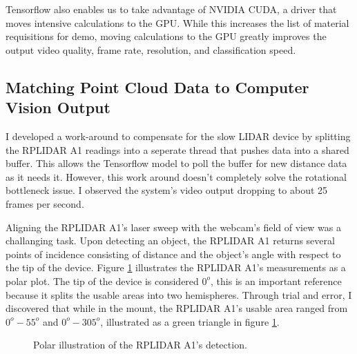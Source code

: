 \documentclass{article}
\begin{document}
  Tensorflow also enables us to take advantage of NVIDIA CUDA, a driver that moves intensive calculations to the GPU.
  While this increases the list of material requisitions for demo, moving calculations to the GPU greatly improves the output video quality, frame rate, resolution, and classification speed. \cite{nvidia}



\subsection{Matching Point Cloud Data to Computer Vision Output}

  I developed a work-around to compensate for the slow LIDAR device by splitting the RPLIDAR A1 readings into a seperate thread that pushes data into a shared buffer.
  This allows the Tensorflow model to poll the buffer for new distance data as it needs it.
  However, this work around doesn't completely solve the rotational bottleneck issue. 
  I observed the system's video output dropping to about 25 frames per second.

  Aligning the RPLIDAR A1's laser sweep with the webcam's field of view was a challanging task.
  Upon detecting an object, the RPLIDAR A1 returns several points of incidence consisting of distance and the object's angle with respect to the tip of the device.
  Figure \ref{polar} illustrates the RPLIDAR A1's measurements as a polar plot.
  The tip of the device is considered \( 0^o \), this is an important reference because it splits the usable areas into two hemispheres.
  Through trial and error, I discovered that while in the mount, the RPLIDAR A1's usable area ranged from \( 0^o - 55^o\) and \( 0^o - 305^o\), illustrated as a green triangle in figure \ref{polar}.

  \begin{figure}[h]
    \centering
    \caption{ Polar illustration of the RPLIDAR A1's detection. }
		\label{polar}
  \end{figure}
\end{document}
